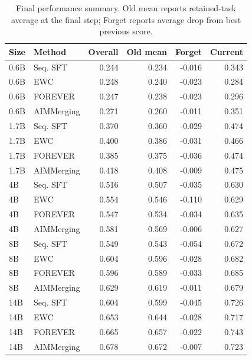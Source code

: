 \documentclass{article}
\begin{document}
\begin{table}[!htbp]
  \centering
  \caption{
  {Final performance summary.}
  Old mean reports retained-task average at the final step; Forget reports average drop from best previous score.
  }
  \label{tab:app_final_performance_summary}
  \footnotesize
  \setlength{\tabcolsep}{4pt}
{
\renewcommand{\arraystretch}{1.05}
\begin{tabular}{llrrrr}
\toprule[0.9pt]
\rowcolor{sizeBand}
Size & Method & Overall & Old mean & Forget & Current \\
\midrule
\rowcolor{refGray} 0.6B & Seq. SFT & 0.244 & 0.234 & -0.016 & 0.343 \\
\rowcolor{refGray} 0.6B & EWC & 0.248 & 0.240 & -0.023 & 0.284 \\
\rowcolor{refGray} 0.6B & FOREVER & 0.247 & 0.238 & -0.023 & 0.296 \\
\rowcolor{mergeBlue} 0.6B & AIMMerging & 0.271 & 0.260 & -0.011 & 0.351 \\
\midrule
\rowcolor{refGray} 1.7B & Seq. SFT & 0.370 & 0.360 & -0.029 & 0.474 \\
\rowcolor{refGray} 1.7B & EWC & 0.400 & 0.386 & -0.031 & 0.466 \\
\rowcolor{refGray} 1.7B & FOREVER & 0.385 & 0.375 & -0.036 & 0.474 \\
\rowcolor{mergeBlue} 1.7B & AIMMerging & 0.418 & 0.408 & -0.009 & 0.475 \\
\midrule
\rowcolor{refGray} 4B & Seq. SFT & 0.516 & 0.507 & -0.035 & 0.630 \\
\rowcolor{refGray} 4B & EWC & 0.554 & 0.546 & -0.110 & 0.629 \\
\rowcolor{refGray} 4B & FOREVER & 0.547 & 0.534 & -0.034 & 0.635 \\
\rowcolor{mergeBlue} 4B & AIMMerging & 0.581 & 0.569 & -0.006 & 0.627 \\
\midrule
\rowcolor{refGray} 8B & Seq. SFT & 0.549 & 0.543 & -0.054 & 0.672 \\
\rowcolor{refGray} 8B & EWC & 0.604 & 0.596 & -0.028 & 0.682 \\
\rowcolor{refGray} 8B & FOREVER & 0.596 & 0.589 & -0.033 & 0.685 \\
\rowcolor{mergeBlue} 8B & AIMMerging & 0.629 & 0.619 & -0.011 & 0.679 \\
\midrule
\rowcolor{refGray} 14B & Seq. SFT & 0.604 & 0.599 & -0.045 & 0.726 \\
\rowcolor{refGray} 14B & EWC & 0.653 & 0.644 & -0.028 & 0.717 \\
\rowcolor{refGray} 14B & FOREVER & 0.665 & 0.657 & -0.022 & 0.743 \\
\rowcolor{mergeBlue} 14B & AIMMerging & 0.678 & 0.672 & -0.007 & 0.723 \\
\bottomrule[0.9pt]
\end{tabular}
}

\end{table}
\end{document}
